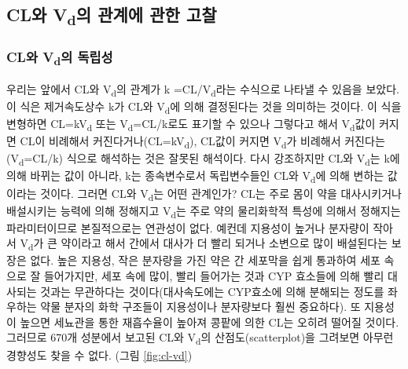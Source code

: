 \documentclass[
  11pt,
  krantz2, a4paper, twoside]{krantz}
\theoremstyle{definition}
\theoremstyle{definition}
\theoremstyle{definition}
\theoremstyle{definition}
\theoremstyle{remark}
\begin{document}
\hypertarget{cluxc640-vduxc758-uxad00uxacc4uxc5d0-uxad00uxd55c-uxace0uxcc30}{%
\subsection{\texorpdfstring{CL와 V\textsubscript{d}의 관계에 관한 고찰}{CL와 Vd의 관계에 관한 고찰}}\label{cluxc640-vduxc758-uxad00uxacc4uxc5d0-uxad00uxd55c-uxace0uxcc30}}

\hypertarget{cluxc640-vduxc758-uxb3c5uxb9bduxc131}{%
\subsubsection{\texorpdfstring{CL와 V\textsubscript{d}의 독립성}{CL와 Vd의 독립성}}\label{cluxc640-vduxc758-uxb3c5uxb9bduxc131}}

우리는 앞에서 CL와 V\textsubscript{d}의 관계가 k =CL/V\textsubscript{d}라는 수식으로 나타낼 수
있음을 보았다. 이 식은 제거속도상수 k가 CL와 V\textsubscript{d}에 의해 결정된다는 것을
의미하는 것이다. 이 식을 변형하면 CL=kV\textsubscript{d} 또는 V\textsubscript{d}=CL/k로도 표기할 수
있으나 그렇다고 해서 V\textsubscript{d}값이 커지면 CL이 비례해서 커진다거나(CL=kV\textsubscript{d}),
CL값이 커지면 V\textsubscript{d}가 비례해서 커진다는(V\textsubscript{d}=CL/k) 식으로 해석하는 것은
잘못된 해석이다. 다시 강조하지만 CL와 V\textsubscript{d}는 k에 의해 바뀌는 값이
아니라, k는 종속변수로서 독립변수들인 CL와 V\textsubscript{d}에 의해 변하는 값이라는 것이다.
그러면 CL와 V\textsubscript{d}는 어떤 관계인가? CL는 주로 몸이 약을 대사시키거나
배설시키는 능력에 의해 정해지고 V\textsubscript{d}는 주로 약의 물리화학적 특성에
의해서 정해지는 파라미터이므로 본질적으로는 연관성이 없다. 예컨데
지용성이 높거나 분자량이 작아서 V\textsubscript{d}가 큰 약이라고 해서 간에서 대사가 더
빨리 되거나 소변으로 많이 배설된다는 보장은 없다. 높은 지용성, 작은
분자량을 가진 약은 간 세포막을 쉽게 통과하여 세포 속으로 잘 들어가지만,
세포 속에 많이, 빨리 들어가는 것과 CYP 효소들에 의해 빨리 대사되는
것과는 무관하다는 것이다(대사속도에는 CYP효소에 의해 분해되는 정도를 좌우하는 약물 분자의
화학 구조들이 지용성이나 분자량보다 훨씬 중요하다). 또 지용성이 높으면
세뇨관을 통한 재흡수율이 높아져 콩팥에 의한 CL는 오히려 떨어질 것이다.
그러므로 670개 성분에서 보고된 CL와 V\textsubscript{d}의 산점도(scatterplot)을
그려보면 아무런 경향성도 찾을 수 없다. (그림 \ref{fig:cl-vd})
\end{document}
